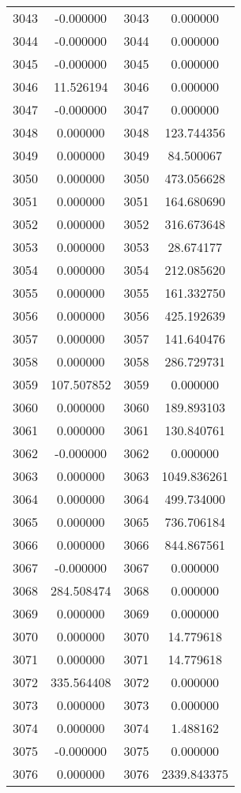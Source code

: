 \documentclass[12pt]{article}
\begin{document}
\begin{longtable}{@{}cccc@{}}
3043 & -0.000000 & 3043 & 0.000000 \\
3044 & -0.000000 & 3044 & 0.000000 \\
3045 & -0.000000 & 3045 & 0.000000 \\
3046 & 11.526194 & 3046 & 0.000000 \\
3047 & -0.000000 & 3047 & 0.000000 \\
3048 & 0.000000 & 3048 & 123.744356 \\
3049 & 0.000000 & 3049 & 84.500067 \\
3050 & 0.000000 & 3050 & 473.056628 \\
3051 & 0.000000 & 3051 & 164.680690 \\
3052 & 0.000000 & 3052 & 316.673648 \\
3053 & 0.000000 & 3053 & 28.674177 \\
3054 & 0.000000 & 3054 & 212.085620 \\
3055 & 0.000000 & 3055 & 161.332750 \\
3056 & 0.000000 & 3056 & 425.192639 \\
3057 & 0.000000 & 3057 & 141.640476 \\
3058 & 0.000000 & 3058 & 286.729731 \\
3059 & 107.507852 & 3059 & 0.000000 \\
3060 & 0.000000 & 3060 & 189.893103 \\
3061 & 0.000000 & 3061 & 130.840761 \\
3062 & -0.000000 & 3062 & 0.000000 \\
3063 & 0.000000 & 3063 & 1049.836261 \\
3064 & 0.000000 & 3064 & 499.734000 \\
3065 & 0.000000 & 3065 & 736.706184 \\
3066 & 0.000000 & 3066 & 844.867561 \\
3067 & -0.000000 & 3067 & 0.000000 \\
3068 & 284.508474 & 3068 & 0.000000 \\
3069 & 0.000000 & 3069 & 0.000000 \\
3070 & 0.000000 & 3070 & 14.779618 \\
3071 & 0.000000 & 3071 & 14.779618 \\
3072 & 335.564408 & 3072 & 0.000000 \\
3073 & 0.000000 & 3073 & 0.000000 \\
3074 & 0.000000 & 3074 & 1.488162 \\
3075 & -0.000000 & 3075 & 0.000000 \\
3076 & 0.000000 & 3076 & 2339.843375 \\

\end{longtable}
\end{document}
